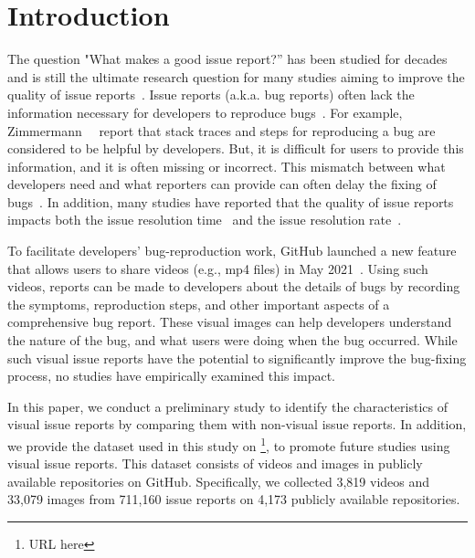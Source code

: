 \section{Introduction}
\label{sec:intro}
The question "What makes a good issue report?'' has been studied for decades and is still the ultimate research question for many studies aiming to improve the quality of issue reports~\citep{DBLP:conf/icse/HerzigJZ13}\citep{zimmermann2010TSE}\citep{DBLP:conf/eclipse/BettenburgJSWPZ07}. Issue reports (a.k.a. bug reports) often lack the information necessary for developers to reproduce bugs~\citep{DBLP:conf/msr/JoorabchiMM14}\citep{DearGitHub}. 
For example, Zimmermann~\et~\citep{zimmermann2010TSE} report that stack traces and steps for reproducing a bug are considered to be helpful by developers. But, it is difficult for users to provide this information, and it is often missing or incorrect. 
This mismatch between what developers need and what reporters can provide can often delay the fixing of bugs~\citep{DBLP:conf/msr/JoorabchiMM14}. In addition, many studies have reported that the quality of issue reports impacts both the issue resolution time~\citep{DBLP:conf/cscw/BreuPSZ10}\citep{DBLP:conf/icse/GuoZNM10} and the issue resolution rate~\citep{DBLP:conf/compsac/ZouXZCL15}\citep{DBLP:conf/icse/ZimmermannNGM12}. 

To facilitate developers' bug-reproduction work, GitHub launched a new feature that allows users to share videos (e.g., mp4 files) in May 2021~\citep{github-video-blog}. Using such videos, reports can be made to developers about the details of bugs by recording the symptoms, reproduction steps, and other important aspects of a comprehensive bug report. These visual images can help developers understand the nature of the bug, and what users were doing when the bug occurred. While such visual issue reports have the potential to significantly improve the bug-fixing process, no studies have empirically examined this impact. 

In this paper, we conduct a preliminary study to identify the characteristics of visual issue reports by comparing them with non-visual issue reports.  In addition, we provide the dataset used in this study on \footnote{URL here}, to promote future studies using visual issue reports. This dataset consists of videos and images in publicly available repositories on GitHub. Specifically, we collected 3,819 videos and 33,079 images from 711,160 issue reports on 4,173 publicly available repositories.



